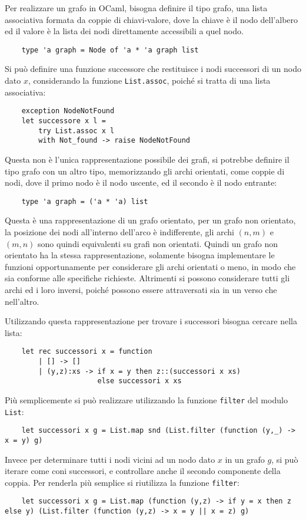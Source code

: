 \documentclass{article}
\numberwithin{equation}{subsection}
\begin{document}
Per realizzare un grafo in OCaml, bisogna definire il tipo grafo, una lista associativa formata da coppie di chiavi-valore, dove la chiave è il nodo dell'albero ed il valore è la lista dei nodi direttamente accessibili a quel nodo. 
\begin{verbatim}
    type 'a graph = Node of 'a * 'a graph list 
\end{verbatim}
Si può definire una funzione successore che restituisce i nodi successori di un nodo dato $x$, considerando la funzione \verb|List.assoc|, poiché si tratta di una lista associativa:
\begin{verbatim}
    exception NodeNotFound
    let successore x l =
        try List.assoc x l
        with Not_found -> raise NodeNotFound
\end{verbatim}

Questa non è l'unica rappresentazione possibile dei grafi, si potrebbe definire il tipo grafo con un altro tipo, memorizzando gli archi orientati, come coppie di nodi, dove il primo nodo è il nodo uscente, ed il secondo è il nodo entrante:
\begin{verbatim}
    type 'a graph = ('a * 'a) list    
\end{verbatim}
Questa è una rappresentazione di un grafo orientato, per un grafo non orientato, la posizione dei nodi all'interno dell'arco è indifferente, gli archi $(n,m)$ e $(m,n)$ sono quindi equivalenti su grafi non orientati. Quindi un grafo non orientato ha la stessa rappresentazione, solamente bisogna implementare le funzioni opportunamente per considerare gli archi orientati o meno, in modo che sia conforme alle specifiche richieste. 
Altrimenti si possono considerare tutti gli archi ed i loro inversi, poiché possono essere attraversati sia in un verso che nell'altro. 

Utilizzando questa rappresentazione per trovare i successori bisogna cercare nella lista:
\begin{verbatim}
    let rec successori x = function
        | [] -> []
        | (y,z):xs -> if x = y then z::(successori x xs)
                      else successori x xs
\end{verbatim}
Più semplicemente si può realizzare utilizzando la funzione \verb|filter| del modulo \verb|List|:
\begin{verbatim}
    let successori x g = List.map snd (List.filter (function (y,_) -> x = y) g)    
\end{verbatim}
Invece per determinare tutti i nodi vicini ad un nodo dato $x$ in un grafo $g$, si può iterare come coni successori, e controllare anche il secondo componente della coppia. Per renderla più semplice si riutilizza la funzione \verb|filter|:
\begin{verbatim}
    let successori x g = List.map (function (y,z) -> if y = x then z else y) (List.filter (function (y,z) -> x = y || x = z) g)    
\end{verbatim}
\end{document}
